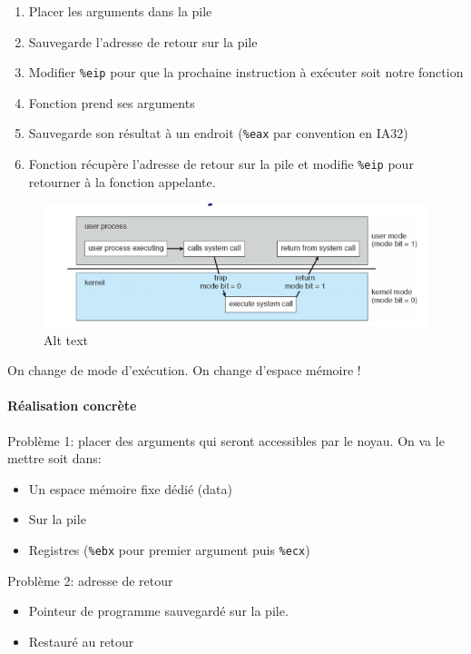 \begin{enumerate}
\def\labelenumi{\arabic{enumi}.}
\tightlist
\item
  Placer les arguments dans la pile
\item
  Sauvegarde l'adresse de retour sur la pile
\item
  Modifier \texttt{\%eip} pour que la prochaine instruction à exécuter
  soit notre fonction
\item
  Fonction prend ses arguments
\item
  Sauvegarde son résultat à un endroit (\texttt{\%eax} par convention en
  IA32)
\item
  Fonction récupère l'adresse de retour sur la pile et modifie
  \texttt{\%eip} pour retourner à la fonction appelante.
\end{enumerate}

\begin{figure}
\centering
\includegraphics{image-12.png}
\caption{Alt text}
\end{figure}

On change de mode d'exécution. On change d'espace mémoire !

\paragraph{Réalisation concrète}\label{ruxe9alisation-concruxe8te}

Problème 1: placer des arguments qui seront accessibles par le noyau. On
va le mettre soit dans:

\begin{itemize}
\tightlist
\item
  Un espace mémoire fixe dédié (data)
\item
  Sur la pile
\item
  Registres (\texttt{\%ebx} pour premier argument puis \texttt{\%ecx})
\end{itemize}

Problème 2: adresse de retour

\begin{itemize}
\tightlist
\item
  Pointeur de programme sauvegardé sur la pile.
\item
  Restauré au retour
\end{itemize}

